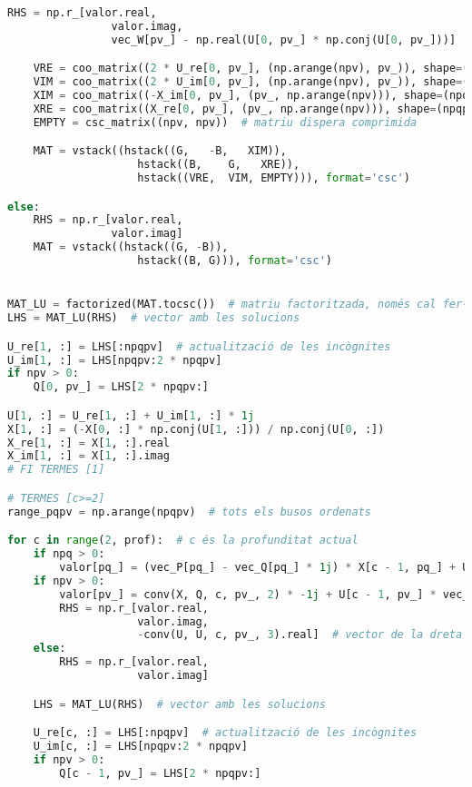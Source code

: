 \begin{lstlisting}[language=Python,numbers=none]
    RHS = np.r_[valor.real,
                valor.imag,
                vec_W[pv_] - np.real(U[0, pv_] * np.conj(U[0, pv_]))]  # vector de la dreta del sistema d'equacions

    VRE = coo_matrix((2 * U_re[0, pv_], (np.arange(npv), pv_)), shape=(npv, npqpv)).tocsc() # matriu COO a compr.
    VIM = coo_matrix((2 * U_im[0, pv_], (np.arange(npv), pv_)), shape=(npv, npqpv)).tocsc()
    XIM = coo_matrix((-X_im[0, pv_], (pv_, np.arange(npv))), shape=(npqpv, npv)).tocsc()
    XRE = coo_matrix((X_re[0, pv_], (pv_, np.arange(npv))), shape=(npqpv, npv)).tocsc()
    EMPTY = csc_matrix((npv, npv))  # matriu dispera comprimida

    MAT = vstack((hstack((G,   -B,   XIM)),
                    hstack((B,    G,   XRE)),
                    hstack((VRE,  VIM, EMPTY))), format='csc')

else:
    RHS = np.r_[valor.real,
                valor.imag]
    MAT = vstack((hstack((G, -B)),
                    hstack((B, G))), format='csc')


MAT_LU = factorized(MAT.tocsc())  # matriu factoritzada, només cal fer-ho una vegada
LHS = MAT_LU(RHS)  # vector amb les solucions

U_re[1, :] = LHS[:npqpv]  # actualització de les incògnites
U_im[1, :] = LHS[npqpv:2 * npqpv]
if npv > 0:
    Q[0, pv_] = LHS[2 * npqpv:]

U[1, :] = U_re[1, :] + U_im[1, :] * 1j
X[1, :] = (-X[0, :] * np.conj(U[1, :])) / np.conj(U[0, :])
X_re[1, :] = X[1, :].real
X_im[1, :] = X[1, :].imag
# FI TERMES [1]

# TERMES [c>=2]
range_pqpv = np.arange(npqpv)  # tots els busos ordenats

for c in range(2, prof):  # c és la profunditat actual
    if npq > 0:
        valor[pq_] = (vec_P[pq_] - vec_Q[pq_] * 1j) * X[c - 1, pq_] + U[c - 1, pq_] * vec_shunts[pq_, 0]
    if npv > 0:
        valor[pv_] = conv(X, Q, c, pv_, 2) * -1j + U[c - 1, pv_] * vec_shunts[pv_, 0] + X[c - 1, pv_] * vec_P[pv_]
        RHS = np.r_[valor.real,
                    valor.imag,
                    -conv(U, U, c, pv_, 3).real]  # vector de la dreta del sistema d'equacions
    else:
        RHS = np.r_[valor.real,
                    valor.imag]

    LHS = MAT_LU(RHS)  # vector amb les solucions

    U_re[c, :] = LHS[:npqpv]  # actualització de les incògnites
    U_im[c, :] = LHS[npqpv:2 * npqpv]
    if npv > 0:
        Q[c - 1, pv_] = LHS[2 * npqpv:]


\end{lstlisting}
